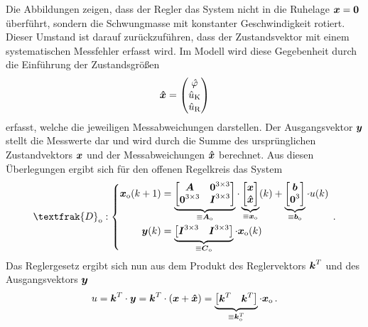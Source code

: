 Die Abbildungen zeigen, dass der Regler das System nicht in die Ruhelage $\boldsymbol{x}=\boldsymbol{0}$ überführt, sondern die Schwungmasse mit konstanter Geschwindigkeit rotiert. Dieser Umstand ist darauf zurückzuführen, dass der Zustandsvektor mit einem systematischen Messfehler erfasst wird. Im Modell wird diese Gegebenheit durch die Einführung der Zustandsgrößen
\begin{equation}
\boldsymbol{\hat{x}} = \begin{pmatrix}
\hat{\varphi} \\ \hat{u}_{\text{K}} \\ \hat{u}_{\text{R}}
\end{pmatrix}
\end{equation}
erfasst, welche die jeweiligen Messabweichungen darstellen. Der Ausgangsvektor $\boldsymbol{y}$ stellt die Messwerte dar und wird durch die Summe des ursprünglichen Zustandvektors $\boldsymbol{x}$ und der Messabweichungen $\boldsymbol{\hat{x}}$ berechnet. Aus diesen Überlegungen ergibt sich für den offenen Regelkreis das System
\begin{equation}
\textfrak{D}\idx{o} : \left\{ \begin{split}
\bs{x}\idx{o}(k+1) &= \underbrace{\begin{bmatrix}
\bs{A} & \bs{0}^{3\times 3} \\ \bs{0}^{3\times 3} & \bs{I}^{3\times 3}\end{bmatrix}}_{\equiv \bs{A}\idx{o}}\cdot \underbrace{\begin{bmatrix}
\bs{x} \\ \bs{\hat{x}}
\end{bmatrix}}_{\equiv \bs{x}\idx{o}}(k) + \underbrace{\begin{bmatrix}
\bs{b} \\ \bs{0}^3 \end{bmatrix}}_{\equiv \bs{b}\idx{o}} \cdot u(k)
\\
\bs{y}(k) &= \underbrace{\begin{bmatrix}
\bs{I}^{3\times 3} & \bs{I}^{3\times 3}\end{bmatrix}}_{\equiv \bs{C}\idx{o}}\cdot \bs{x}\idx{o}(k)
\end{split}
\right. \,.
\end{equation}
Das Reglergesetz ergibt sich nun aus dem Produkt des Reglervektors $\boldsymbol{k}^T$ und des Ausgangsvektors $\boldsymbol{y}$
\begin{equation}
u = \boldsymbol{k}^T\cdot \boldsymbol{y} = \boldsymbol{k}^T \cdot (\boldsymbol{x} + \boldsymbol{\hat{x}}) = \underbrace{\begin{bmatrix}
\boldsymbol{k}^T & \boldsymbol{k}^T
\end{bmatrix}}_{\equiv \boldsymbol{k}^T_{\text{o}}} \cdot \boldsymbol{x}_{\text{o}} \,.
\end{equation}
